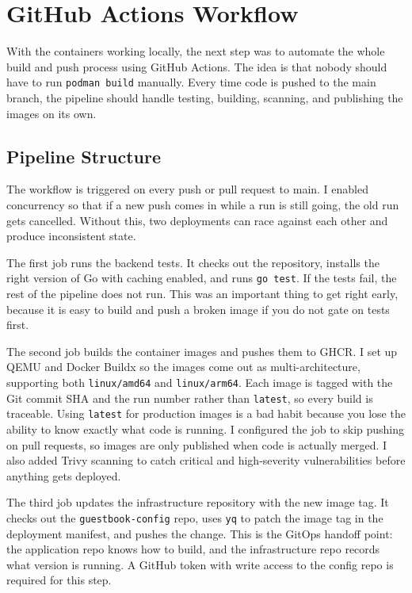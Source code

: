\section{GitHub Actions Workflow}

With the containers working locally, the next step was to automate the whole build and
push process using GitHub Actions. The idea is that nobody should have to run
\texttt{podman build} manually. Every time code is pushed to the main branch, the
pipeline should handle testing, building, scanning, and publishing the images on its own.

\subsection{Pipeline Structure}

The workflow is triggered on every push or pull request to main. I enabled concurrency
so that if a new push comes in while a run is still going, the old run gets cancelled.
Without this, two deployments can race against each other and produce inconsistent state.

The first job runs the backend tests. It checks out the repository, installs the right
version of Go with caching enabled, and runs \texttt{go test}. If the tests fail, the
rest of the pipeline does not run. This was an important thing to get right early,
because it is easy to build and push a broken image if you do not gate on tests first.

The second job builds the container images and pushes them to GHCR. I set up QEMU and
Docker Buildx so the images come out as multi-architecture, supporting both
\texttt{linux/amd64} and \texttt{linux/arm64}. Each image is tagged with the Git commit
SHA and the run number rather than \texttt{latest}, so every build is traceable.
Using \texttt{latest} for production images is a bad habit because you lose the ability
to know exactly what code is running. I configured the job to skip pushing on pull
requests, so images are only published when code is actually merged. I also added Trivy
scanning to catch critical and high-severity vulnerabilities before anything gets
deployed.

The third job updates the infrastructure repository with the new image tag. It checks
out the \texttt{guestbook-config} repo, uses \texttt{yq} to patch the image tag in the
deployment manifest, and pushes the change. This is the GitOps handoff point: the
application repo knows how to build, and the infrastructure repo records what version
is running. A GitHub token with write access to the config repo is required for this step.

